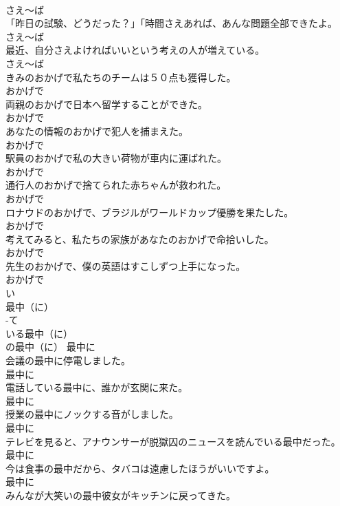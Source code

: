 \documentclass[8pt]{extreport}
\begin{document}
\begin{CJK}{UTF8}{min}
\\	さえ～ば	
\\	「昨日の試験、どうだった？」「時間さえあれば、あんな問題全部できたよ。	
\\	さえ～ば	
\\	最近、自分さえよければいいという考えの人が増えている。	
\\	さえ～ば	
\\	きみのおかげで私たちのチームは５０点も獲得した。	
\\	おかげで	
\\	両親のおかげで日本へ留学することができた。	
\\	おかげで	
\\	あなたの情報のおかげで犯人を捕まえた。	
\\	おかげで	
\\	駅員のおかげで私の大きい荷物が車内に運ばれた。	
\\	おかげで	
\\	通行人のおかげで捨てられた赤ちゃんが救われた。	
\\	おかげで	
\\	ロナウドのおかげで、ブラジルがワールドカップ優勝を果たした。	
\\	おかげで	
\\	考えてみると、私たちの家族があなたのおかげで命拾いした。	
\\	おかげで	
\\	先生のおかげで、僕の英語はすこしずつ上手になった。	
\\	おかげで	
\\	い
\\	最中（に）	
\\	-て
\\	いる最中（に）	
\\	の最中（に）	最中に	
\\	会議の最中に停電しました。	
\\	最中に	
\\	電話している最中に、誰かが玄関に来た。	
\\	最中に	
\\	授業の最中にノックする音がしました。	
\\	最中に	
\\	テレビを見ると、アナウンサーが脱獄囚のニュースを読んでいる最中だった。	
\\	最中に	
\\	今は食事の最中だから、タバコは遠慮したほうがいいですよ。	
\\	最中に	
\\	みんなが大笑いの最中彼女がキッチンに戻ってきた。	

\end{CJK}
\end{document}
